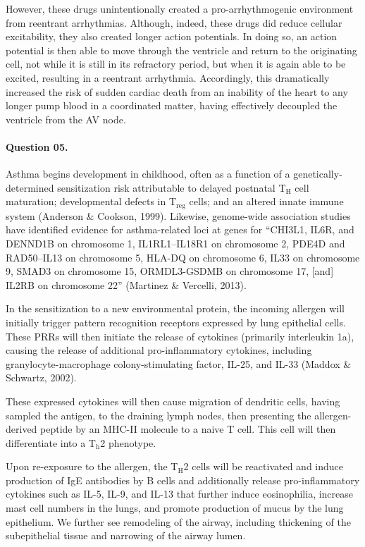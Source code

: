 \documentclass[11pt,letterpaper,final] {article}
\newcommand{\sub}[1]{\ensuremath{_{\text{#1}}}}
\begin{document}
However, these drugs unintentionally created a pro-arrhythmogenic environment from reentrant arrhythmias. Although, indeed, these drugs did reduce cellular excitability, they also created longer action potentials. In doing so, an action potential is then able to move through the ventricle and return to the originating cell, not while it is still in its refractory period, but when it is again able to be excited, resulting in a reentrant arrhythmia. Accordingly, this dramatically increased the risk of sudden cardiac death from an inability of the heart to any longer pump blood in a coordinated matter, having effectively decoupled the ventricle from the AV node.

\paragraph{Question 05.} Asthma begins development in childhood, often as a function of a genetically-determined sensitization risk attributable to delayed postnatal T\sub{H} cell maturation; developmental defects in T\sub{reg} cells; and an altered innate immune system (Anderson \& Cookson, 1999). Likewise, genome-wide association studies have identified evidence for asthma-related loci at genes for ``CHI3L1, IL6R, and DENND1B on chromosome 1, IL1RL1–IL18R1 on chromosome 2, PDE4D and RAD50–IL13 on chromosome 5, HLA-DQ on chromosome 6, IL33 on chromosome 9, SMAD3 on chromosome 15, ORMDL3-GSDMB on
chromosome 17, [and] IL2RB on chromosome 22'' (Martinez \& Vercelli, 2013).

In the sensitization to a new environmental protein, the incoming allergen will initially trigger pattern recognition receptors expressed by lung epithelial cells. These PRRs will then initiate the release of cytokines (primarily interleukin 1a), causing the release of additional pro-inflammatory cytokines, including granylocyte-macrophage colony-stimulating factor, IL-25, and IL-33 (Maddox \& Schwartz, 2002).

These expressed cytokines will then cause migration of dendritic cells, having sampled the antigen, to the draining lymph nodes, then presenting the allergen-derived peptide by an MHC-II molecule to a naive T cell. This cell will then differentiate into a T\sub{h}2 phenotype.

Upon re-exposure to the allergen, the T\sub{H}2 cells will be reactivated and induce production of IgE antibodies by B cells and additionally release pro-inflammatory cytokines such as IL-5, IL-9, and IL-13 that further induce eosinophilia, increase mast cell numbers in the lungs, and promote production of mucus by the lung epithelium. We further see remodeling of the airway, including thickening of the subepithelial tissue and narrowing of the airway lumen.
\end{document}
